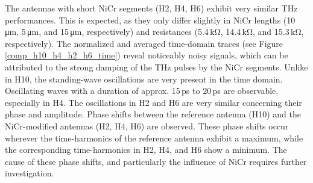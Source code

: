The antennas with short NiCr segments (H2, H4, H6) exhibit very similar THz performances. This is expected, as they only differ slightly in NiCr lengths (\num{10}\,\si{\micro\meter}, \num{5}\,\si{\micro\meter}, and \num{15}\,\si{\micro\meter}, respectively) and resistances (\num{5.4}\,\si{\kilo\ohm}, \num{14.4}\,\si{\kilo\ohm}, and \num{15.3}\,\si{\kilo\ohm}, respectively). The normalized and averaged time-domain traces (see Figure \ref{comp_h10_h4_h2_h6_time}) reveal noticeably noisy signals, which can be attributed to the strong damping of the THz pulses by the NiCr segments. Unlike in H10, the standing-wave oscillations are very present in the time domain. Oscillating waves with a duration of approx. \num{15}\,\si{\pico \s} to \num{20}\,\si{\pico \s} are observable, especially in H4. The oscillations in H2 and H6 are very similar concerning their phase and amplitude. Phase shifts between the reference antenna (H10) and the NiCr-modified antennas (H2, H4, H6) are observed. These phase shifts occur wherever the time-harmonics of the reference antenna exhibit a maximum, while the corresponding time-harmonics in H2, H4, and H6 show a minimum. The cause of these phase shifts, and particularly the influence of NiCr requires further investigation.
